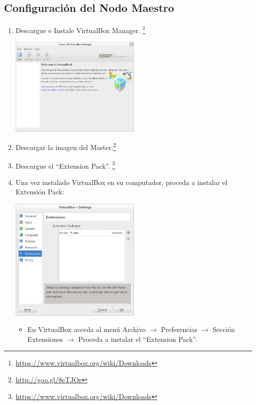 \subsection{Configuración del Nodo Maestro}
\begin{enumerate}

\item Descargue e Instale VirtualBox Manager. \footnote{\url{https://www.virtualbox.org/wiki/Downloads}}

\includegraphics[width=0.5\textwidth]{aux/vb_instalado}

\item Descargar la imagen del Master.\footnote{\url{http://goo.gl/8eTJOr}}

\item Descargue el ``Extension Pack''. \footnote{\url{https://www.virtualbox.org/wiki/Downloads}}

\item Una vez instalado VirtualBox en su computador, proceda a instalar el Extensión Pack: 

	\includegraphics[width=0.5\textwidth]{aux/sinextensionpack}
	
\begin{itemize}


	\item En VirtualBox acceda al menú Archivo $\rightarrow$ Preferencias $\rightarrow$ Sección Extensiones $\rightarrow$ Proceda a instalar el ``Extension Pack''. 
	

\end{itemize}
\end{enumerate}
